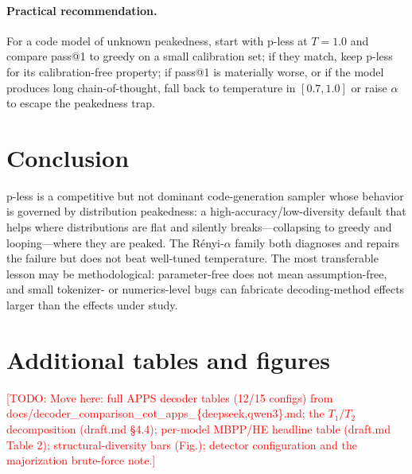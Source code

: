 \documentclass[11pt]{article}                       %
\newcommand{\td}[1]{\textcolor{red}{[TODO: #1]}}     %
\begin{document}
\paragraph{Practical recommendation.} For a code model of unknown peakedness, start with p-less at
$T{=}1.0$ and compare pass@1 to greedy on a small calibration set; if they match, keep p-less for its
calibration-free property; if pass@1 is materially worse, or if the model produces long chain-of-thought,
fall back to temperature in $[0.7,1.0]$ or raise $\alpha$ to escape the peakedness trap.

\section{Conclusion}\label{sec:conclusion}
p-less is a competitive but not dominant code-generation sampler whose behavior is governed by
distribution peakedness: a high-accuracy/low-diversity default that helps where distributions are flat
and silently breaks---collapsing to greedy and looping---where they are peaked. The R\'enyi-$\alpha$
family both diagnoses and repairs the failure but does not beat well-tuned temperature. The most
transferable lesson may be methodological: parameter-free does not mean assumption-free, and small
tokenizer- or numerics-level bugs can fabricate decoding-method effects larger than the effects under
study.




\appendix
\section{Additional tables and figures}
\td{Move here: full APPS decoder tables (12/15 configs) from
docs/decoder\_comparison\_cot\_apps\_\{deepseek,qwen3\}.md; the $T_1/T_2$ decomposition
(draft.md \S4.4); per-model MBPP/HE headline table (draft.md Table 2); structural-diversity bars
(Fig.); detector configuration and the majorization brute-force note.}
\end{document}
